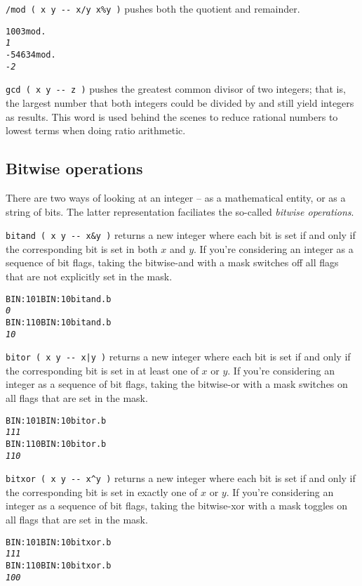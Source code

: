 \documentclass[english]{article}
\begin{document}
\texttt{/mod ( x y -{}- x/y x\%y )} pushes both the quotient and remainder.

\begin{alltt}
100 3 mod .
\emph{1}
-546 34 mod .
\emph{-2}
\end{alltt}

\texttt{gcd ( x y -{}- z )} pushes the greatest common divisor of two integers; that is, the largest number that both integers could be divided by and still yield integers as results. This word is used behind the scenes to reduce rational numbers to lowest terms when doing ratio arithmetic.

\subsection{Bitwise operations}

There are two ways of looking at an integer -- as a mathematical entity, or as a string of bits. The latter representation faciliates the so-called \emph{bitwise operations}.

\texttt{bitand ( x y -{}- x\&y )} returns a new integer where each bit is set if and only if the corresponding bit is set in both $x$ and $y$. If you're considering an integer as a sequence of bit flags, taking the bitwise-and with a mask switches off all flags that are not explicitly set in the mask.

\begin{alltt}
BIN: 101 BIN: 10 bitand .b
\emph{0}
BIN: 110 BIN: 10 bitand .b
\emph{10}
\end{alltt}

\texttt{bitor ( x y -{}- x|y )} returns a new integer where each bit is set if and only if the corresponding bit is set in at least one of $x$ or $y$. If you're considering an integer as a sequence of bit flags, taking the bitwise-or with a mask switches on all flags that are set in the mask.

\begin{alltt}
BIN: 101 BIN: 10 bitor .b
\emph{111}
BIN: 110 BIN: 10 bitor .b
\emph{110}
\end{alltt}

\texttt{bitxor ( x y -{}- x\^{}y )} returns a new integer where each bit is set if and only if the corresponding bit is set in exactly one of $x$ or $y$. If you're considering an integer as a sequence of bit flags, taking the bitwise-xor with a mask toggles on all flags that are set in the mask.

\begin{alltt}
BIN: 101 BIN: 10 bitxor .b
\emph{111}
BIN: 110 BIN: 10 bitxor .b
\emph{100}
\end{alltt}
\end{document}
